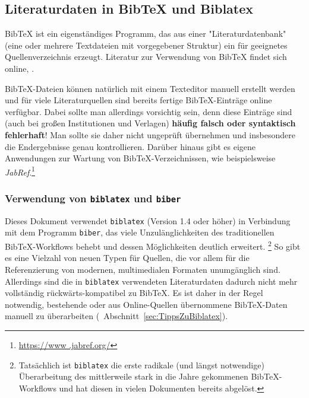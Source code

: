 \subsection{Literaturdaten in BibTeX und Biblatex}
\label{sec:bibtex}

BibTeX ist ein eigenständiges Programm, das aus einer "Literaturdatenbank" (eine oder mehrere Textdateien mit
vorgegebener Struktur) ein für \latex geeignetes Quellenverzeichnis erzeugt. Literatur zur Verwendung von BibTeX
findet sich online, \zB \cite{Feder2006, Patashnik1988}.

BibTeX-Dateien können natürlich mit einem Texteditor manuell erstellt werden und für viele Literaturquellen sind
bereits fertige BibTeX-Einträge online verfügbar. Dabei sollte man allerdings vorsichtig sein, denn diese Einträge
sind (auch bei großen Institutionen und Verlagen) \textbf{häufig falsch oder syntaktisch fehlerhaft}! Man sollte sie
daher nicht ungeprüft übernehmen und insbesondere die Endergebnisse genau kontrollieren. Darüber hinaus gibt es
eigene Anwendungen zur Wartung von BibTeX-Verzeichnissen, wie beispielsweise \emph{JabRef}.\footnote{\url{https://www
.jabref.org/}}


\subsubsection{Verwendung von \texttt{biblatex} und \texttt{biber}}

Dieses Dokument verwendet \texttt{biblatex} (Version 1.4 oder höher) in Verbindung mit dem Programm \texttt{biber},
das viele Unzulänglichkeiten des traditionellen BibTeX-Workflows behebt und dessen Möglichkeiten deutlich erweitert.%
\footnote{Tatsächlich ist \texttt{biblatex} die erste radikale (und längst notwendige) Überarbeitung des mittlerweile
stark in die Jahre gekommenen BibTeX-Workflows und hat diesen in vielen Dokumenten bereits abgelöst.}
So gibt es eine Vielzahl von neuen Typen für Quellen, die vor allem für die Referenzierung von modernen,
multimedialen Formaten unumgänglich sind. Allerdings sind die in \texttt{biblatex} verwendeten Literaturdaten dadurch
nicht mehr vollständig rückwärts-kompatibel zu BibTeX. Es ist daher in der Regel notwendig, bestehende oder aus
Online-Quellen übernommene BibTeX-Daten manuell zu überarbeiten (\sa\ Abschnitt~\ref{sec:TippsZuBiblatex}).

